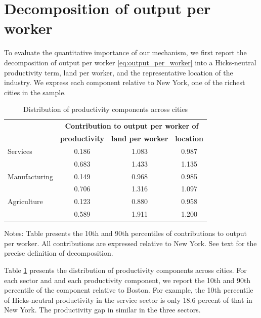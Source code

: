 \documentclass[12pt]{article}
\begin{document}
\section{Decomposition of output per worker}
To evaluate the quantitative importance of our mechanism, we first report the decomposition of output per worker \eqref{eq:output_per_worker} into a Hicks-neutral productivity term, land per worker, and the representative location of the industry. We express each component relative to New York, one of the richest cities in the sample.

\begin{table}[h!]
  \begin{center}
  \caption{Distribution of productivity components across cities\label{tab:decomposition}}
    \begin{tabular}{lccc}
    \toprule
    \textbf{} & \multicolumn{3}{c}{\textbf{Contribution to output per worker of}}\\
    \textbf{} & \textbf{productivity} & \textbf{land per worker} & \textbf{location} \\
    \midrule
Services	& 0.186	& 1.083	& 0.987	\\
	& 0.683	& 1.433	& 1.135	\\
				
Manufacturing	& 0.149	& 0.968	& 0.985	\\
	& 0.706	& 1.316	& 1.097	\\
				
Agriculture	& 0.123	& 0.880	& 0.958	\\
	& 0.589	& 1.911	& 1.200	\\
    \bottomrule
    \end{tabular}%

  \end{center}
  \noindent \footnotesize{Notes: Table presents the 10th and 90th percentiles of contributions to output per worker. All contributions are expressed relative to New York. See text for the precise definition of decomposition.}
\end{table}

Table \ref{tab:decomposition} presents the distribution of productivity components across cities. For each sector and and each productivity component, we report the 10th and 90th percentile of the component relative to Boston. For example, the 10th percentile of Hicks-neutral productivity in the service sector is only 18.6 percent of that in New York. The productivity gap in similar in the three sectors.
\end{document}
